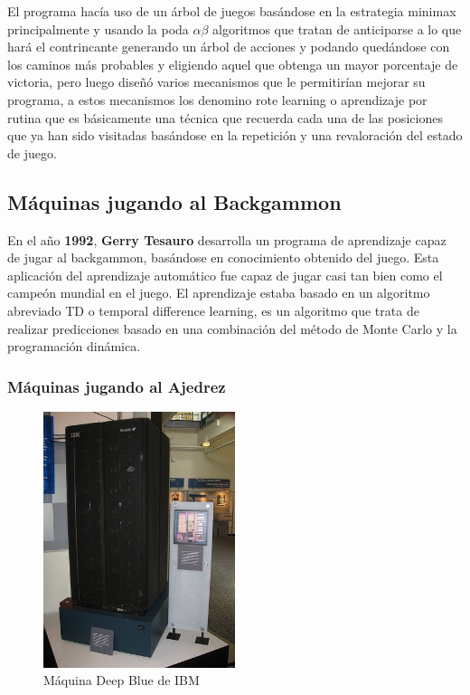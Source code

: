\documentclass[a4paper, 11pt]{article} %
\begin{document}
El programa hacía uso de un árbol de juegos basándose en la estrategia minimax principalmente y usando la poda $\alpha\beta$ algoritmos que tratan de anticiparse a lo que hará el contrincante generando un árbol de acciones y podando quedándose con los caminos más probables y eligiendo aquel que obtenga un mayor porcentaje de victoria, pero luego diseñó varios mecanismos que le permitirían mejorar su programa, a estos mecanismos los denomino rote learning o aprendizaje por rutina que es básicamente una técnica que recuerda cada una de las posiciones que ya han sido visitadas basándose en la repetición y una revaloración del estado de juego.

\subsection{Máquinas jugando al Backgammon}
En el año \textbf{1992}, \textbf{Gerry Tesauro} desarrolla un programa de aprendizaje capaz de jugar al backgammon, basándose en conocimiento obtenido del juego. Esta aplicación del aprendizaje automático fue capaz de jugar casi tan bien como el campeón mundial en el juego. El aprendizaje estaba basado en un algoritmo abreviado TD o temporal difference learning, es un algoritmo que trata de realizar predicciones basado en una combinación del método de Monte Carlo y la programación dinámica.

\subsubsection{Máquinas jugando al Ajedrez}

\begin{figure}[H]
\centering
\includegraphics[width=0.5\textwidth]{deepblue}
\caption{Máquina Deep Blue de IBM}
\label{Ejemplo kNN}
\end{figure}
\end{document}
